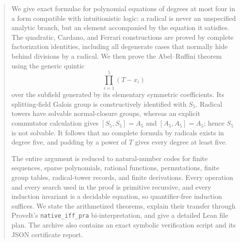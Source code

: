 \documentclass[11pt,oneside]{article}
\DeclareRobustCommand{\code}[1]{\ifmmode\text{\ttfamily\detokenize{#1}}\else\nolinkurl{#1}\fi}
\begin{document}
\begin{abstract}
We give exact formulae for polynomial equations of degrees at most four in a
form compatible with intuitionistic logic: a radical is never an unspecified
analytic branch, but an element accompanied by the equation it satisfies.  The
quadratic, Cardano, and Ferrari constructions are proved by complete
factorization identities, including all degenerate cases that normally hide
behind divisions by a radical.  We then prove the Abel--Ruffini theorem using
the generic quintic
\[
  \prod_{i=1}^{5}(T-x_i)
\]
over the subfield generated by its elementary symmetric coefficients.  Its
splitting-field Galois group is constructively identified with $S_5$.
Radical towers have solvable normal-closure groups, whereas an explicit
commutator calculation gives
$[S_5,S_5]=A_5$ and $[A_5,A_5]=A_5$; hence $S_5$ is not solvable.  It follows
that no complete formula by radicals exists in degree five, and padding by a
power of $T$ gives every degree at least five.

The entire argument is reduced to natural-number codes for finite sequences,
sparse polynomials, rational functions, permutations, finite group tables,
radical-tower records, and finite derivations.  Every operation and every
search used in the proof is primitive recursive, and every induction invariant
is a decidable equation, so quantifier-free induction suffices.  We state the
arithmetized theorems, explain their transfer through ProveIt's
\code{native_iff_pra} bi-interpretation, and give a detailed Lean file plan.
The archive also contains an exact symbolic verification script and its JSON
certificate report.
\end{abstract}

\tableofcontents
\clearpage
{}
















\end{document}
